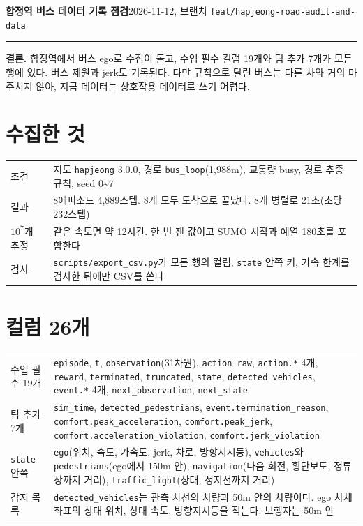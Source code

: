 \documentclass[9pt,a4paper]{extarticle}
\newcommand{\col}[1]{\texttt{#1}}
\begin{document}
{\Large\bfseries 합정역 버스 데이터 기록 점검}\hfill 2026-11-12, 브랜치 \col{feat/hapjeong-road-audit-and-data}

\vspace{2pt}\hrule\vspace{4pt}
\textbf{결론.} 합정역에서 버스 ego로 수집이 돌고, 수업 필수 컬럼 19개와 팀 추가 7개가 모든 행에 있다.
버스 제원과 jerk도 기록된다. 다만 규칙으로 달린 버스는 다른 차와 거의 마주치지 않아, 지금 데이터는 상호작용 데이터로 쓰기 어렵다.

\section{수집한 것}
\begin{tabular}{@{}>{\raggedright}p{3.1cm}p{14.6cm}@{}}
조건 & 지도 \col{hapjeong} 3.0.0, 경로 \col{bus\_loop}(1,988m), 교통량 busy, 경로 추종 규칙, seed 0\textasciitilde 7 \\
결과 & 8에피소드 4,889스텝. 8개 모두 도착으로 끝났다. 8개 병렬로 21초(초당 232스텝) \\
$10^7$개 추정 & 같은 속도면 약 12시간. 한 번 잰 값이고 SUMO 시작과 예열 180초를 포함한다 \\
검사 & \col{scripts/export\_csv.py}가 모든 행의 컬럼, \col{state} 안쪽 키, 가속 한계를 검사한 뒤에만 CSV를 쓴다 \\
\end{tabular}

\section{컬럼 26개}
\begin{tabular}{@{}>{\raggedright}p{3.1cm}p{14.6cm}@{}}
\toprule
수업 필수 19개 & \col{episode}, \col{t}, \col{observation}(31차원), \col{action\_raw}, \col{action.*} 4개, \col{reward}, \col{terminated}, \col{truncated}, \col{state}, \col{detected\_vehicles}, \col{event.*} 4개, \col{next\_observation}, \col{next\_state} \\
팀 추가 7개 & \col{sim\_time}, \col{detected\_pedestrians}, \col{event.termination\_reason}, \col{comfort.peak\_acceleration}, \col{comfort.peak\_jerk}, \col{comfort.acceleration\_violation}, \col{comfort.jerk\_violation} \\
\col{state} 안쪽 & \col{ego}(위치, 속도, 가속도, jerk, 차로, 방향지시등), \col{vehicles}와 \col{pedestrians}(ego에서 150m 안), \col{navigation}(다음 회전, 횡단보도, 정류장까지 거리), \col{traffic\_light}(상태, 정지선까지 거리) \\
감지 목록 & \col{detected\_vehicles}는 관측 차선의 차량과 50m 안의 차량이다. ego 차체 좌표의 상대 위치, 상대 속도, 방향지시등을 적는다. 보행자는 50m 안 \\
\bottomrule
\end{tabular}
\end{document}
